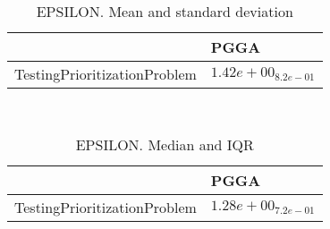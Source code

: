 \documentclass{article}
\begin{document}
\
\begin{table}
\caption{EPSILON. Mean and standard deviation}
\label{table:mean.EPSILON}
\centering
\begin{scriptsize}
\begin{tabular}{ll}
\hline &  PGGA\\
\hline
TestingPrioritizationProblem & \cellcolor{gray95}$  1.42e+00_{ 8.2e-01}$ \\
\hline
\end{tabular}
\end{scriptsize}
\end{table}
\
\begin{table}
\caption{EPSILON. Median and IQR}
\label{table:median.EPSILON}
\begin{scriptsize}
\centering
\begin{tabular}{ll}
\hline &  PGGA\\
\hline
TestingPrioritizationProblem & \cellcolor{gray95}$  1.28e+00_{ 7.2e-01}$ \\
\hline
\end{tabular}
\end{scriptsize}
\end{table}
\end{document}
